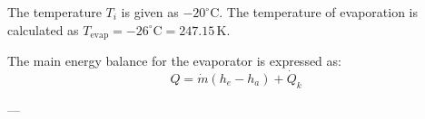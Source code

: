 The temperature \( T_i \) is given as \( -20^\circ\text{C} \).  
The temperature of evaporation is calculated as \( T_{\text{evap}} = -26^\circ\text{C} = 247.15 \, \text{K} \).

The main energy balance for the evaporator is expressed as:  
\[
Q = \dot{m}(h_e - h_a) + \dot{Q}_k
\]

---